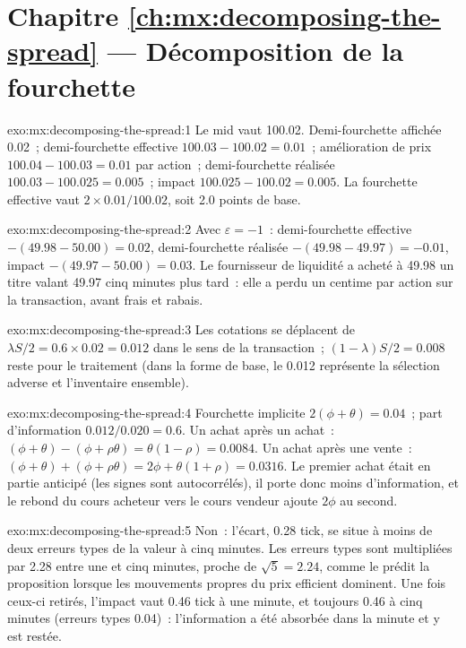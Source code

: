 \section*{Chapitre \ref{ch:mx:decomposing-the-spread} --- Décomposition de la fourchette}

\begin{solution}{exo:mx:decomposing-the-spread:1}
Le mid vaut 100.02. Demi-fourchette affichée 0.02~; demi-fourchette effective $100.03-100.02=0.01$~; amélioration de prix $100.04-100.03=0.01$ par action~; demi-fourchette
réalisée $100.03-100.025=0.005$~; impact $100.025-100.02=0.005$. La fourchette effective vaut $2\times0.01/100.02$, soit 2.0 points de base.
\end{solution}

\begin{solution}{exo:mx:decomposing-the-spread:2}
Avec $\varepsilon=-1$~: demi-fourchette effective $-(49.98-50.00)=0.02$, demi-fourchette réalisée $-(49.98-49.97)=-0.01$, impact $-(49.97-50.00)=0.03$. Le fournisseur de liquidité a acheté à 49.98
un titre valant 49.97 cinq minutes plus tard~: elle a perdu un centime par action sur la transaction, avant frais et rabais.
\end{solution}

\begin{solution}{exo:mx:decomposing-the-spread:3}
Les cotations se déplacent de $\lambda S/2=0.6\times0.02=0.012$ dans le sens de la transaction~; $(1-\lambda)S/2=0.008$ reste pour le traitement (dans la forme de base, le
0.012 représente la sélection adverse et l'inventaire ensemble).
\end{solution}

\begin{solution}{exo:mx:decomposing-the-spread:4}
Fourchette implicite $2(\phi+\theta)=0.04$~; part d'information $0.012/0.020=0.6$. Un achat après un achat~: $(\phi+\theta)-(\phi+\rho\theta)=\theta(1-\rho)=0.0084$. Un achat
après une vente~: $(\phi+\theta)+(\phi+\rho\theta)=2\phi+\theta(1+\rho)=0.0316$. Le premier achat était en partie anticipé (les signes sont autocorrélés), il porte donc moins
d'information, et le rebond du cours acheteur vers le cours vendeur ajoute $2\phi$ au second.
\end{solution}

\begin{solution}{exo:mx:decomposing-the-spread:5}
Non~: l'écart, 0.28 tick, se situe à moins de deux erreurs types de la valeur à cinq minutes. Les erreurs types sont multipliées par 2.28 entre une et cinq minutes, proche
de $\sqrt5=2.24$, comme le prédit la proposition lorsque les mouvements propres du prix efficient dominent. Une fois ceux-ci retirés, l'impact vaut 0.46 tick à une
minute, et toujours 0.46 à cinq minutes (erreurs types 0.04)~: l'information a été absorbée dans la minute et y est restée.
\end{solution}

